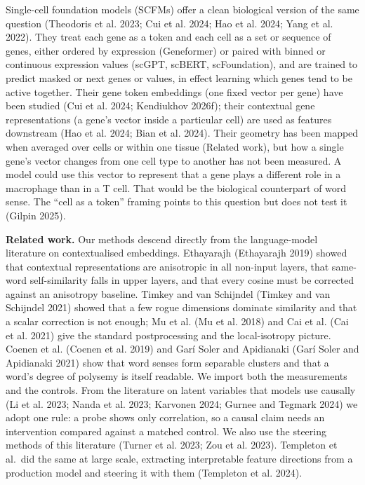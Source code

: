 \documentclass[
  11pt,
]{article}
\begin{document}
Single-cell foundation models (SCFMs) offer a clean biological version
of the same question (Theodoris et al. 2023; Cui et al. 2024; Hao et al.
2024; Yang et al. 2022). They treat each gene as a token and each cell
as a set or sequence of genes, either ordered by expression (Geneformer)
or paired with binned or continuous expression values (scGPT, scBERT,
scFoundation), and are trained to predict masked or next genes or
values, in effect learning which genes tend to be active together. Their
gene token embeddings (one fixed vector per gene) have been studied (Cui
et al. 2024; Kendiukhov 2026f); their contextual gene representations (a
gene's vector inside a particular cell) are used as features downstream
(Hao et al. 2024; Bian et al. 2024). Their geometry has been mapped when
averaged over cells or within one tissue (Related work), but how a
single gene's vector changes from one cell type to another has not been
measured. A model could use this vector to represent that a gene plays a
different role in a macrophage than in a T cell. That would be the
biological counterpart of word sense. The ``cell as a token'' framing
points to this question but does not test it (Gilpin 2025).

\textbf{Related work.} Our methods descend directly from the
language-model literature on contextualised embeddings. Ethayarajh
(Ethayarajh 2019) showed that contextual representations are anisotropic
in all non-input layers, that same-word self-similarity falls in upper
layers, and that every cosine must be corrected against an anisotropy
baseline. Timkey and van Schijndel ({Timkey and van Schijndel} 2021)
showed that a few rogue dimensions dominate similarity and that a scalar
correction is not enough; Mu et al. (Mu et al. 2018) and Cai et al. (Cai
et al. 2021) give the standard postprocessing and the local-isotropy
picture. Coenen et al. (Coenen et al. 2019) and Garí Soler and
Apidianaki (Garí Soler and Apidianaki 2021) show that word senses form
separable clusters and that a word's degree of polysemy is itself
readable. We import both the measurements and the controls. From the
literature on latent variables that models use causally (Li et al. 2023;
Nanda et al. 2023; Karvonen 2024; Gurnee and Tegmark 2024) we adopt one
rule: a probe shows only correlation, so a causal claim needs an
intervention compared against a matched control. We also use the
steering methods of this literature (Turner et al. 2023; {Zou et al.}
2023). Templeton et al.~did the same at large scale, extracting
interpretable feature directions from a production model and steering it
with them ({Templeton et al.} 2024).
\end{document}
